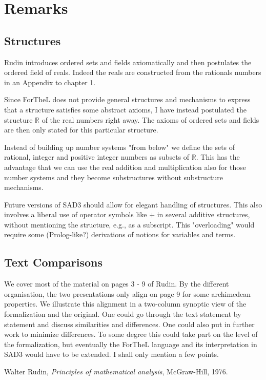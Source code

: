 \documentclass{article}
\begin{document}
\section{Remarks}
\subsection{Structures}

Rudin introduces ordered sets and fields axiomatically and then postulates the ordered field of reals. Indeed the reals are constructed from the rationals numbers in an Appendix to chapter 1.

Since ForTheL does not provide general structures and mechanisms to express that a structure satisfies some abstract axioms, I have instead postulated the structure $\mathbb{R}$ of the real numbers right away. The axioms of ordered sets and fields are then only stated for this particular structure.

Instead of building up number systems "from below" we define the sets of rational, integer and positive integer numbers as subsets of $\mathbb{R}$. This has the advantage that we can use the real addition and multiplication also for those number systems and they become substructures without substructure mechanisms.

Future versions of SAD3 should allow for elegant handling of structures. This also involves a liberal use of operator symbols like $+$ in several additive structures, without mentioning the structure, e.g., as a subscript. This "overloading" would require some (Prolog-like?) derivations of notions for variables and terms.

\subsection{Text Comparisons}

We cover most of the material on pages 3 - 9 of Rudin. By the different organisation, the two presentations only align on page 9 for some archimedean properties. We illustrate this alignment in a two-column synoptic view of the formalization and the original. One could go through the text statement by statement and discuss similarities and differences. One could also put in further work to minimize differences. To some degree this could take part on the level of the formalization, but eventually the ForTheL language and its interpretation in SAD3 would have to be extended.
I shall only mention a few points.






\begin{thebibliography}{1}

  Walter Rudin,
  \textit{Principles of mathematical analysis},
  McGraw-Hill,
  1976.

\end{thebibliography}
  
\end{document}

